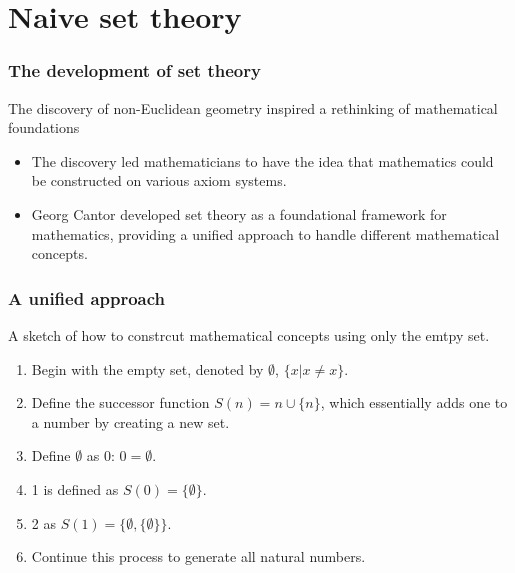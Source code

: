 \documentclass[unicode, 14pt, aspectratio=169]{beamer}
\begin{document}
\section{Naive set theory}
\begin{frame}
  \frametitle{The development of set theory}
  {\large The discovery of non-Euclidean geometry inspired a rethinking of mathematical foundations}
  \begin{itemize}
  \item The discovery led mathematicians to have the idea that mathematics could be constructed on various axiom systems.
  \item Georg Cantor developed set theory as a foundational framework for mathematics, providing a unified approach to handle different mathematical concepts. 
  \end{itemize}
\end{frame}
\begin{frame}
  \frametitle{A unified approach}
  {\large A sketch of how to constrcut mathematical concepts using only the emtpy set.}
  \par
  \begin{enumerate}
  \item Begin with the empty set, denoted by $\emptyset$, $\{x|x\neq x\}$.
  \item Define the successor function $ S(n) = n \cup \{n\} $, which essentially adds one to a number by creating a new set.    
  \item Define $\emptyset$ as 0: $ 0 = \emptyset$.
  \item 1 is defined as $S(0) = \{ \emptyset \}$.
  \item 2 as $S(1) = \{ \emptyset, \{ \emptyset \} \}$.
  \item Continue this process to generate all natural numbers.    
  \end{enumerate}
\end{frame}
\end{document}
